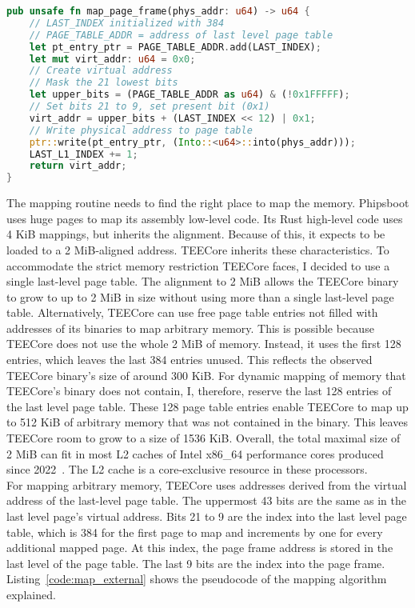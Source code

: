 \begin{lstlisting}[language=Rust, caption=Mapping of external memory, label=code:map_external]
pub unsafe fn map_page_frame(phys_addr: u64) -> u64 {
    // LAST_INDEX initialized with 384
    // PAGE_TABLE_ADDR = address of last level page table
    let pt_entry_ptr = PAGE_TABLE_ADDR.add(LAST_INDEX);
    let mut virt_addr: u64 = 0x0;
    // Create virtual address
    // Mask the 21 lowest bits
    let upper_bits = (PAGE_TABLE_ADDR as u64) & (!0x1FFFFF);
    // Set bits 21 to 9, set present bit (0x1)
    virt_addr = upper_bits + (LAST_INDEX << 12) | 0x1;
    // Write physical address to page table
    ptr::write(pt_entry_ptr, (Into::<u64>::into(phys_addr)));
    LAST_L1_INDEX += 1;
    return virt_addr;
}
\end{lstlisting}

The mapping routine needs to find the right place to map the memory. Phipsboot
uses huge pages to map its assembly low-level code. Its Rust high-level code
uses 4 KiB mappings, but inherits the alignment. Because of this, it expects to
be loaded to a 2 MiB-aligned address. TEECore inherits these characteristics. To
accommodate the strict memory restriction TEECore faces, I decided to use a
single last-level page table. The alignment to 2 MiB allows the TEECore binary
to grow to up to 2 MiB in size without using more than a single last-level page
table. Alternatively, TEECore can use free page table entries not filled with
addresses of its binaries to map arbitrary memory. This is possible because
TEECore does not use the whole 2 MiB of memory. Instead, it uses the first 128
entries, which leaves the last 384 entries unused. This reflects the observed
TEECore binary's size of around 300 KiB. For dynamic mapping of memory that
TEECore's binary does not contain, I, therefore, reserve the last 128 entries of
the last level page table. These 128 page table entries enable TEECore to map up
to 512 KiB of arbitrary memory that was not contained in the binary. This leaves
TEECore room to grow to a size of 1536 KiB. Overall, the total maximal size of 2
MiB can fit in most L2 caches of Intel x86\_64 performance cores produced since
2022~\cite{intel_optimization}. The L2 cache is a core-exclusive resource in
these processors.\\

For mapping arbitrary memory, TEECore uses addresses derived from the virtual
address of the last-level page table. The uppermost 43 bits are the same as in
the last level page's virtual address. Bits 21 to 9 are the index into the last
level page table, which is 384 for the first page to map and increments by one
for every additional mapped page. At this index, the page frame address is
stored in the last level of the page table. The last 9 bits are the index into
the page frame. Listing~\ref{code:map_external} shows the pseudocode of the
mapping algorithm explained.\\


